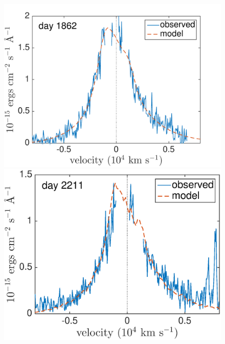 \begin{figure}
\centering
\includegraphics[trim =0 0 0 0,clip=true,scale=0.37]{chapters/chapter5/images/smooth/best_fit/d1862Ha.pdf}
\hspace{1mm}
\includegraphics[trim =0 0 0 0,clip=true,scale=0.37]{chapters/chapter5/images/smooth/best_fit/d2211Ha}


\end{figure}
